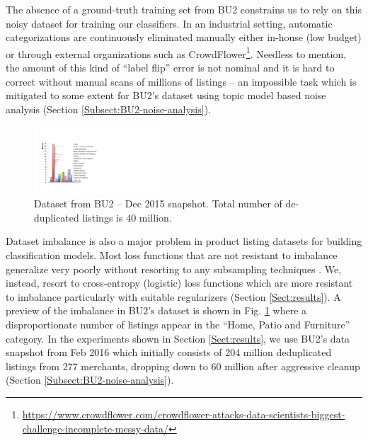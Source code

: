 The absence of a ground-truth training set from BU2 constrains us to rely on this noisy dataset for training our classifiers. 
In an industrial setting, automatic categorizations are continuously eliminated manually either in-house (low budget) or through external organizations such as CrowdFlower\footnote{\scriptsize{\url{https://www.crowdflower.com/crowdflower-attacks-data-scientists-biggest-challenge-incomplete-messy-data/}}}.
Needless to mention, the amount of this kind of ``label flip'' error is not nominal and it is hard to correct without manual scans of millions of listings -- an impossible task which is mitigated to some extent for BU2's dataset using topic model based noise analysis (Section \ref{Subsect:BU2-noise-analysis}).


\begin{figure}
	\centering
	\vspace{-0.5cm}
	\includegraphics[width=0.42\textwidth]{images/BU2-dataset-Dec2015}
	\vspace{-0.6cm}
	\caption{{\small Dataset from BU2 -- Dec 2015 snapshot. Total number of de-duplicated listings is 40 million.}}
	\vspace{-0.5cm}
	\label{Figure_BU2-datset-earlier}
\end{figure}
Dataset imbalance is also a major problem in product listing datasets for building classification models.
Most loss functions that are not resistant to imbalance generalize very poorly without resorting to any subsampling techniques \cite{Chawla02:SMOTE}. 
We, instead, resort to cross-entropy (logistic) loss functions which are more resistant to imbalance particularly with suitable regularizers (Section \ref{Sect:results}). 
A preview of the imbalance in BU2's dataset is shown in Fig. \ref{Figure_BU2-datset-earlier} where a disproportionate number of listings appear in the ``Home, Patio and Furniture'' category.
In the experiments shown in Section \ref{Sect:results}, we use BU2's data snapshot from Feb 2016 which initially consists of 204 million deduplicated listings from 277 merchants, dropping down to 60 million after aggressive cleanup (Section \ref{Subsect:BU2-noise-analysis}).



